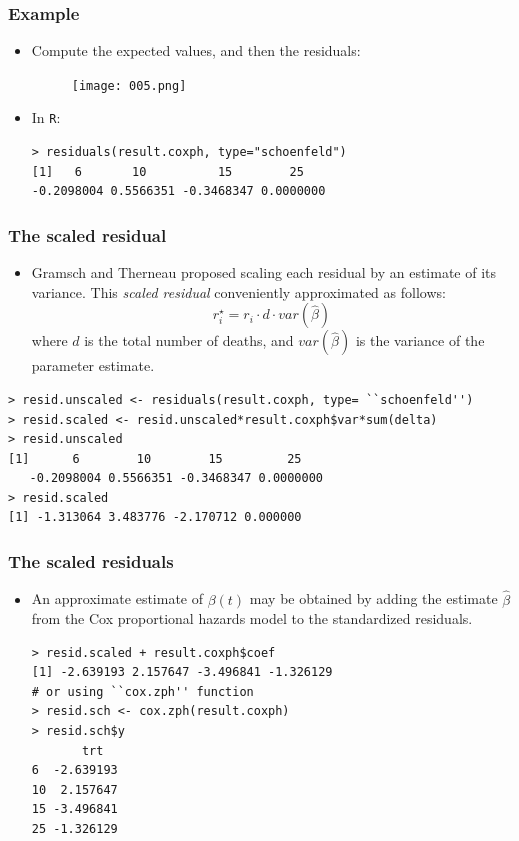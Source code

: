 \documentclass{beamer}
\newcommand{\empr}[1]{{\emph{\color{red}#1}}}
\begin{document}
\pagebreak
\begin{frame}[fragile]
\frametitle{Example}
\begin{itemize}
\item Compute the expected values, and then the residuals:
\begin{figure}
	\texttt{[image: 005.png]}
\end{figure}
\item In \texttt{R}:\linebreak
\begin{Verbatim}
> residuals(result.coxph, type="schoenfeld") 
[1]   6       10          15        25
-0.2098004 0.5566351 -0.3468347 0.0000000
\end{Verbatim}
\end{itemize}
\end{frame}

\pagebreak
\begin{frame}[fragile]
\frametitle{The scaled residual}
\begin{itemize}
\item Gramsch and Therneau proposed scaling each residual by an estimate of its variance. This \empr{scaled residual} conveniently approximated as follows:
\begin{equation}
r_{i}^{\star} = r_i\cdot d\cdot var(\hat{\beta})
\end{equation}
where $d$ is the total number of deaths, and $var(\hat{\beta})$ is the variance of the parameter estimate.
\end{itemize}
\begin{Verbatim}
> resid.unscaled <- residuals(result.coxph, type= ``schoenfeld'') 
> resid.scaled <- resid.unscaled*result.coxph$var*sum(delta)
> resid.unscaled
[1]      6        10        15         25 
   -0.2098004 0.5566351 -0.3468347 0.0000000
> resid.scaled
[1] -1.313064 3.483776 -2.170712 0.000000
\end{Verbatim}
\end{frame}


\pagebreak
\begin{frame}[fragile]
\frametitle{The scaled residuals}
\begin{itemize}
\item An approximate estimate of $\beta(t)$ may be obtained by adding the estimate $\hat{\beta}$ from the Cox proportional hazards model to the standardized residuals.
\begin{Verbatim}
> resid.scaled + result.coxph$coef
[1] -2.639193 2.157647 -3.496841 -1.326129
# or using ``cox.zph'' function
> resid.sch <- cox.zph(result.coxph)
> resid.sch$y
       trt
6  -2.639193
10  2.157647
15 -3.496841
25 -1.326129
\end{Verbatim}
\end{itemize}
\end{frame}
\end{document}
